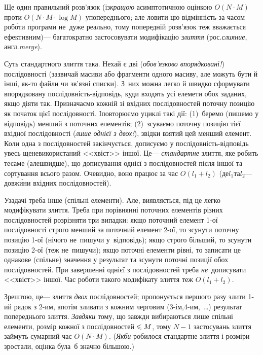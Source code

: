 \documentclass[14pt,a4paper]{extarticle}
\begin{document}
Ще один правильний розв'язок (із\nolinebreak[2] \emph{кращою} асимптотичною оцінкою $O(N{\cdot}M)$ проти $O(N{\cdot}M{\cdot}\log{}M)$ у\nolinebreak[3] попереднього; але ловити цю відмінність за часом роб\'{о}ти програми не~дуже реально, тому попередній розв'язок теж вважається ефективним)\nolinebreak[3] --- багатократно застосовувати модифікацію \emph{злиття} (рос.\nolinebreak[3] \emph{слияние}, англ.\nolinebreak[3] \emph{merge}). 

Суть стандартного злиття така. Нехай є дві (\emph{обов'язково впорядковані!}) послідовності (зазвичай масиви або фрагменти одного масиву, але можуть бути й інші, як-то файли чи зв'язні списки). З~них можна легко й швидко сформувати впорядковану послі\-дов\-ність-від\-повідь, куди входять усі елемети обох заданих, якщо діяти так. Призначаємо кожній зі вхідних послідовностей поточну позицію як початок цієї послідовності. І\nolinebreak[3] повторюємо у\nolinebreak[3] циклі такі дії: (1)~беремо (пишемо у відповідь) менший з поточних елементів; (2)~зсуваємо поточну позицію тієї вхідної послідовності (\emph{лише однієї з двох!}), звідки взятий цей менший елемент. Коли одна з послідовностей закінчується, дописуємо у послі\-дов\-ність-від\-по\-відь увесь ще\nolinebreak[3] не\nolinebreak[3] використаний <<хвіст>> іншої. Це\nolinebreak[3] --- \emph{стандартне} злиття, яке робить те\nolinebreak[3] саме (але\nolinebreak[3] швидше), що дописування однієї з послідовностей після іншої та сортування всього разом. Очевидно, воно працює за час $O(l_1{+}l_2)$ (де\nolinebreak[3] $l_1$\nolinebreak[1] та\nolinebreak[3] $l_2$\nolinebreak[3] --- довж\'{и}ни вхідних послідовностей).

У\nolinebreak[3] задачі треба інше (спільні елементи). Але, виявляється, під це легко модифікувати злиття. Треба при порівнянні поточних елементів різних послідовностей розрізняти три випадки: якщо поточний елемент \mbox{1-ої} послідовності строго менший за поточний елемент \mbox{2-ої}, то зсунути поточну позицію \mbox{1-ої} (нічого не~пишучи у~відповідь); якщо строго більший, то зсунути позицію \mbox{2-ої} (теж не~пишучи); якщо поточні елементи рівні, то записати це однакове (спільне) значення у результат та зсунути поточні позиції обох послідовностей. При завершенні однієї з послідовностей треба \emph{не}~дописувати <<хвіст>> іншої. Час роботи такого модифікату злиття теж $O(l_1{+}l_2)$.

Зрештою, це\nolinebreak[3] --- злиття \emph{двох} послідовностей; пропонується першого разу злити \mbox{1-ий} рядок з \mbox{2-им}, а\nolinebreak[3] потім зливати з кожним черговим (\mbox{3-ім},\nolinebreak[2] \mbox{4-им},~\dots) результат попереднього злиття. \emph{Завдяки} тому, що завжди вибираються лише спільні елементи, розмір кожної з послідовностей${}\leqslant M$, тому ${N{-}1}$ застосувань злиття займуть сумарний час $O(N{\cdot}M)$. (\emph{Якби} робилося стандартне злиття і розміри зростали, оцінка була~б значно більшою.)
\end{document}
